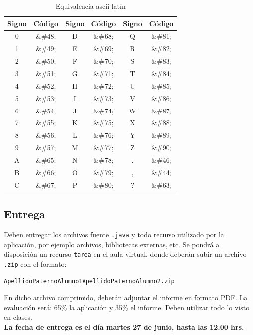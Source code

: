 \documentclass[a4paper,10pt]{article}
\theoremstyle{mytheor}
\begin{document}
\begin{table}[H]
    \begin{center}
        \caption{Equivalencia ascii-lat\'in}\label{tab:t2}
        \begin{tabular}{|c|c|c|c|c|c|} \hline
            \textbf{Signo} & \textbf{C\'odigo} & \textbf{Signo} & \textbf{C\'odigo} & \textbf{Signo} & \textbf{C\'odigo} \\ \hline
            0&\&\#48;	& D&\&\#68; & Q&\&\#81;	 \\ \hline
            1&\&\#49;	& E&\&\#69; & R&\&\#82;	 \\ \hline
            2&\&\#50;	& F&\&\#70; & S&\&\#83;	\\\hline
            3&\&\#51;	& G&\&\#71; & T&\&\#84;	 \\\hline
            4&\&\#52;	& H&\&\#72; & U&\&\#85;	 \\\hline
            5&\&\#53;	& I&\&\#73; & V&\&\#86;	 \\\hline
            6&\&\#54;	& J&\&\#74; & W&\&\#87;	\\\hline
            7&\&\#55;	& K&\&\#75; & X&\&\#88;	 \\\hline
            8&\&\#56;	& L&\&\#76; & Y&\&\#89;  \\\hline
            9&\&\#57;	& M&\&\#77; & Z&\&\#90;	 \\\hline
            A&\&\#65;	& N&\&\#78; & . &\&\#46;	 \\\hline
            B&\&\#66;	& O&\&\#79; & , &\&\#44;	 \\\hline
            C&\&\#67; & P&\&\#80; & ? &\&\#63;	 \\ \hline
		\end{tabular}
    \end{center}
\end{table}

\subsection{Entrega}

Deben entregar los archivos fuente \texttt{.java} y todo recurso utilizado por la aplicaci\'on, por ejemplo archivos, bibliotecas externas, etc. Se pondr\'a a disposici\'on un recurso \texttt{tarea} en el aula virtual, donde deber\'an subir un archivo \texttt{.zip} con el formato: 

\begin{center}
\texttt{ApellidoPaternoAlumno1ApellidoPaternoAlumno2.zip}
\end{center}
 
\noindent
En dicho archivo comprimido, deber\'an adjuntar el informe en formato PDF. La evaluaci\'on ser\'a: 65\% la aplicaci\'on y 35\% el informe. Deben utilizar todo lo visto en clases.\\

\noindent
\textbf{La fecha de entrega es el d\'ia martes 27 de junio, hasta las 12.00 hrs.}
\end{document}
